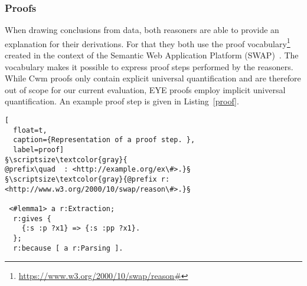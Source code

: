 





\subsubsection{Proofs}\label{pro}
When drawing conclusions from data, both reasoners are able to provide an explanation for their derivations. For that they both use the \nthree proof 
vocabulary\footnote{\url{https://www.w3.org/2000/10/swap/reason\#}}  
created in the context of the Semantic Web Application
Platform (SWAP)~\cite{SWAP}. The vocabulary makes it possible to express proof steps performed by the reasoners. While Cwm proofs only contain explicit universal 
quantification and are therefore out of scope for our current evaluation, EYE proofs employ implicit universal quantification. 
An example proof step is given in Listing~\ref{proof}.
\begin{lstlisting}[
  float=t,
  caption={Representation of a proof step. },
  label=proof]
§\scriptsize\textcolor{gray}{
@prefix\quad  : <http://example.org/ex\#>.}§
§\scriptsize\textcolor{gray}{@prefix r: <http://www.w3.org/2000/10/swap/reason\#>.}§

 <#lemma1> a r:Extraction;
  r:gives {
    {:s :p ?x1} => {:s :pp ?x1}.
  };
  r:because [ a r:Parsing ].
\end{lstlisting}

